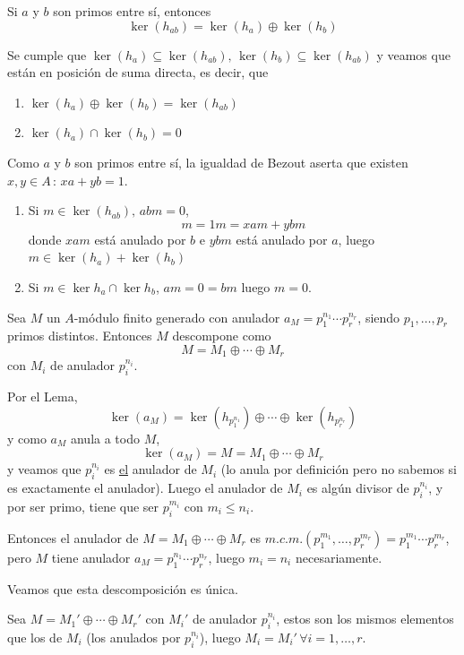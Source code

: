  \begin{lem}
 Si $a$ y $b$ son primos entre s\'i, entonces $$\ker(h_{ab}) = \ker(h_a) \oplus \ker(h_b)$$
 \end{lem}
 \begin{dem}
    Se cumple que $\ker (h_a) \subseteq \ker(h_{ab}), \, \ker (h_b) \subseteq \ker(h_{ab})$ y veamos que est\'an en posici\'on de suma directa, es decir, que
    \begin{enumerate}
        \item $\ker(h_a) \oplus \ker(h_b) = \ker(h_{ab}) $
        \item $\ker(h_{a}) \cap \ker(h_{b}) = 0$ 
    \end{enumerate}
    Como $a$ y $b$ son primos entre s\'i, la igualdad de Bezout aserta que existen $x,y \in A \, : \, xa+yb=1$. \begin{enumerate}
        \item Si $m \in \ker(h_{ab}), \, ab m = 0$, 
       $$ m = 1 m = xam + ybm$$
       donde $xam$ est\'a anulado por $b$ e $ybm$ est\'a anulado por $a$, luego $m \in \ker (h_a) + \ker(h_b)$
       \item Si $m \in \ker h_a \cap \ker h_b$, $am=0=bm$ luego $m=0$.  
    \end{enumerate}
 \end{dem}
\begin{teo}
    Sea $M$ un $A$-m\'odulo finito generado con anulador $a_M = p_1^{n_1} \cdots p_r^{n_r}$, siendo $p_1, \ldots, p_r$ primos distintos. Entonces $M$ descompone como 
    $$M = M_1 \oplus \cdots \oplus M_r$$
    con $M_i$ de anulador $p_i^{n_i}$. 
 \end{teo}
 \begin{dem}
    Por el Lema, 
    $$\ker(a_M) = \ker (h_{p_1^{n_1}}) \oplus \cdots \oplus  \ker (h_{p_r^{n_r}})$$
    y como $a_M$ anula a todo $M$, 
    $$\ker(a_M) = M = M_1 \oplus \cdots \oplus M_r$$
    y veamos que $p_i^{n_i}$ es \underline{el} anulador de $M_i$ (lo anula por definici\'on pero no sabemos si es exactamente el anulador). Luego el anulador de $M_i$ es alg\'un divisor de $p_i^{n_i}$, y por ser primo, tiene que ser $p_i^{m_i}$ con $m_i \leq n_i$. 

    Entonces el anulador de $M=M_1\oplus \cdots \oplus M_r$ es $m.c.m.(p_1^{m_1}, \ldots,  p_r^{m_r}) = p_1^{m_1} \cdots p_r^{m_r}$, pero $M$ tiene anulador $a_M = p_1^{n_1} \cdots p_r^{n_r}$, luego $m_i = n_i$ necesariamente.

    Veamos que esta descomposición es \'unica.

    Sea $M = M_1' \oplus \cdots \oplus M_r'$ con $M_i'$ de anulador $p_i^{n_i}$, estos son los mismos elementos que los de $M_i$ (los anulados por $p_i^{n_i}$), luego $M_i = M_i' \, \forall i = 1, \ldots, r$. 
 \end{dem}

